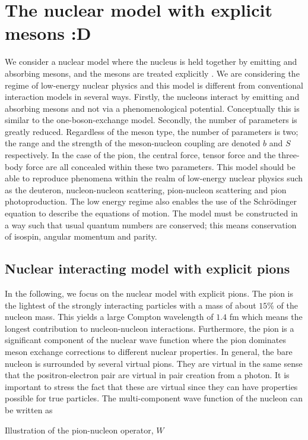\chapter{The nuclear model with explicit mesons :D}\label{Decsofmodel}

We consider a nuclear model where the nucleus is held together by emitting and absorbing mesons, and the mesons are treated explicitly \cite[]{Mesons}. We are considering the regime of low-energy nuclear physics and this model is different from conventional interaction models in several ways. Firstly, the nucleons interact by emitting and absorbing mesons and not via a phenomenological potential. Conceptually this is similar to the one-boson-exchange model. Secondly, the number of parameters is greatly reduced. Regardless of the meson type, the number of parameters is two; the range and the strength of the meson-nucleon coupling are denoted $b$ and $S$ respectively. In the case of the pion, the central force, tensor force and the three-body force are all concealed within these two parameters. This model should be able to reproduce phenomena within the realm of low-energy nuclear physics such as the deuteron, nucleon-nucleon scattering, pion-nucleon scattering and pion photoproduction. The low energy regime also enables the use of the Schrödinger equation to describe the equations of motion. The model must be constructed in a way such that usual quantum numbers are conserved; this means conservation of isospin, angular momentum and parity. 

\section{Nuclear interacting model with explicit pions }\label{sec:model}

In the following, we focus on the nuclear model with explicit pions. The pion is the lightest of the strongly interacting particles with a mass of about $15\%$ of the nucleon mass. This yields a large Compton wavelength of $1.4$ fm which means the longest contribution to nucleon-nucleon interactions. Furthermore, the pion is a significant component of the nuclear wave function where the pion dominates meson exchange corrections to different nuclear properties. In general, the bare nucleon is surrounded by several virtual pions. 
They are virtual in the same sense that the positron-electron pair are virtual in pair creation from a photon. It is important to stress the fact that these are virtual since they can have properties possible for true particles. The multi-component wave function of the nucleon can be written as
\begin{marginfigure}
	\centering
	
	\caption{Illustration of the pion-nucleon operator, $W$}
	\label{fig:superposition}
\end{marginfigure}

